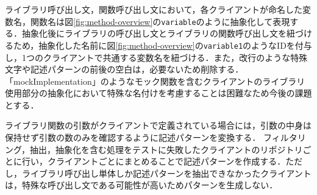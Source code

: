\documentclass[T,J]{fose} %
\newcommand{\todo}[1]{\colorbox{yellow}{{\bf TODO}:}{\color{red} {\textbf{[#1]}}}}
\newcommand{\change}[1]{\colorbox{green}{{\bf CHANGE}:}{\color{red} {\textbf{[#1]}}}}
\begin{document}
ライブラリ呼び出し文，関数呼び出し文において，各クライアントが命名した変数名，関数名は図\ref{fig:method-overview}の\texttt{variable}のように抽象化して表現する．抽象化後にライブラリの呼び出し文とライブラリの関数呼び出し文を紐づけるため，抽象化した名前に図\ref{fig:method-overview}の\texttt{variable1}のようなIDを付与し，1つのクライアントで共通する変数名を紐づける．また，改行のような特殊文字や記述パターンの前後の空白は，必要ないため削除する．「mockImplementation」のようなモック関数を含むクライアントのライブラリ使用部分の抽象化において特殊な名付けを考慮することは困難なため今後の課題とする．

ライブラリ関数の引数がクライアントで定義されている場合には，引数の中身は保持せず引数の数のみを確認するように記述パターンを変換する．
フィルタリング，抽出，抽象化を含む処理をテストに失敗したクライアントのリポジトリごとに行い，クライアントごとにまとめることで記述パターンを作成する．ただし，ライブラリ呼び出し単体しか記述パターンを抽出できなかったクライアントは，特殊な呼び出し文である可能性が高いためパターンを生成しない．


\end{document}
